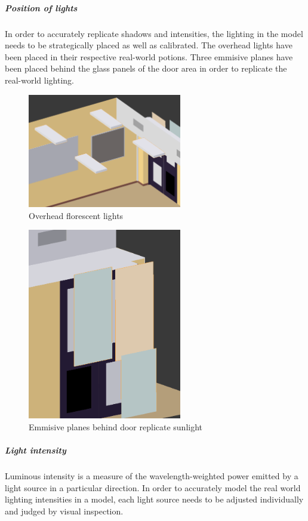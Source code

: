 \documentclass[11pt,a4paper]{report}
\begin{document}
					\subparagraph{Position of lights}
						In order to accurately replicate shadows and intensities, the lighting in the model needs to be strategically placed as well as calibrated. The overhead lights have been placed in their respective real-world potions. Three emmisive planes have been placed behind the glass panels of the door area in order to replicate the real-world lighting.
						
						\begin{figure}[H]
							\centering
							\includegraphics[width=0.6\textwidth]{overhead_lights}
							\caption{Overhead florescent lights}
						\end{figure}
						\begin{figure}[H]
							\centering
							\includegraphics[width=0.6\textwidth]{lights_behind_door}
							\caption{Emmisive planes behind door replicate sunlight}
						\end{figure}
					
					\subparagraph{Light intensity}
						Luminous intensity is a measure of the wavelength-weighted power emitted by a light source in a particular direction. In order to accurately model the real world lighting intensities in a model, each light source needs to be adjusted individually and judged by visual inspection. 
						
\end{document}
